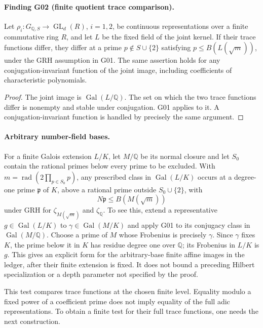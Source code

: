 \documentclass[11pt,a4paper]{article}
\begin{document}
\paragraph{Finding G02 (finite quotient trace comparison).}
Let $\rho_i:G_{\mathbb Q,S}\to\operatorname{GL}_d(R)$, $i=1,2$, be continuous representations over a finite commutative ring $R$, and let $L$ be the fixed field of the joint kernel. If their trace functions differ, they differ at a prime $p\notin S\cup\{2\}$ satisfying $p\le B(L(\sqrt m))$, under the GRH assumption in G01. The same assertion holds for any conjugation-invariant function of the joint image, including coefficients of characteristic polynomials.

\begin{proof}
The joint image is $\operatorname{Gal}(L/\mathbb Q)$.  The set on which the two trace functions differ is nonempty and stable under conjugation.  G01 applies to it.  A conjugation-invariant function is handled by precisely the same argument.
\end{proof}

\paragraph{Arbitrary number-field bases.}
For a finite Galois extension $L/K$, let $M/\mathbb Q$ be its normal closure and let $S_0$ contain the rational primes below every prime to be excluded.  With $m=\operatorname{rad}(2\prod_{p\in S_0}p)$, any prescribed class in $\operatorname{Gal}(L/K)$ occurs at a degree-one prime $\mathfrak p$ of $K$, above a rational prime outside $S_0\cup\{2\}$, with
\[
 N\mathfrak p\le B(M(\sqrt m))
\]
under GRH for $\zeta_{M(\sqrt m)}$ and $\zeta_{\mathbb Q}$.  To see this, extend a representative $g\in\operatorname{Gal}(L/K)$ to $\gamma\in\operatorname{Gal}(M/K)$ and apply G01 to its conjugacy class in $\operatorname{Gal}(M/\mathbb Q)$.  Choose a prime of $M$ whose Frobenius is precisely $\gamma$.  Since $\gamma$ fixes $K$, the prime below it in $K$ has residue degree one over $\mathbb Q$; its Frobenius in $L/K$ is $g$.  This gives an explicit form for the arbitrary-base finite affine images in the ledger, after their finite extension is fixed.  It does not bound a preceding Hilbert specialization or a depth parameter not specified by the proof.

This test compares trace functions at the chosen finite level.  Equality modulo a fixed power of a coefficient prime does not imply equality of the full adic representations.  To obtain a finite test for their full trace functions, one needs the next construction.
\end{document}
